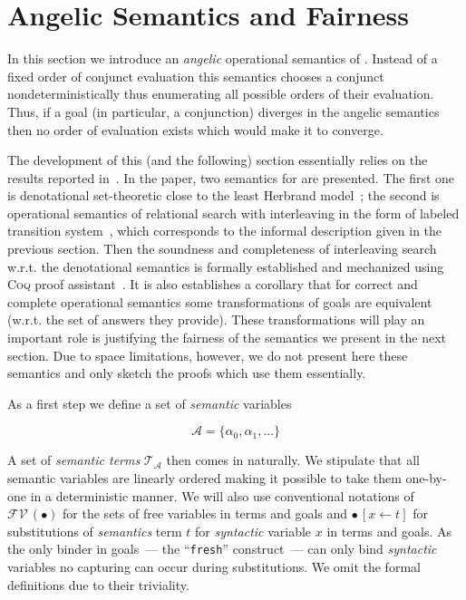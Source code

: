 \section{Angelic Semantics and Fairness}
\label{sec:angelic-semantics}

In this section we introduce an \emph{angelic} operational semantics of \mk. Instead of a fixed order of conjunct evaluation this semantics chooses a conjunct nondeterministically
thus enumerating all possible orders of their evaluation. Thus, if a goal (in particular, a conjunction) diverges in the angelic semantics then no order of evaluation exists which
would make it to converge.

The development of this (and the following) section essentially relies on the results reported in~\cite{fair:semantics}. In the paper, two semantics for \mk are presented. The first one is
denotational set-theoretic close to the least Herbrand model~\cite{Lloyd}; the second is operational semantics of relational search with interleaving in the form of labeled transition
system~\cite{LTS}, which corresponds to the informal description given in the previous section. Then the soundness and completeness of interleaving search w.r.t. the denotational semantics
is formally established and mechanized using \textsc{Coq} proof assistant~\cite{Coq}. It is also establishes a corollary that for correct and complete operational semantics some
transformations of goals are equivalent (w.r.t. the set of answers they provide). These transformations will play an important role is justifying the fairness of the semantics we present
in the next section. Due to space limitations, however, we do not present here these semantics and only sketch the proofs which use them essentially.
 
As a first step we define a set of \emph{semantic} variables

\[
\mathcal{A}=\{\alpha_0,\alpha_1,\dots\}
\]

A set of \emph{semantic terms} $\mathcal{T}_{\mathcal A}$ then comes in naturally. We stipulate that all semantic variables are linearly ordered making it possible to take them one-by-one
in a deterministic manner. We will also use conventional notations of $\mathcal{FV}\,(\bullet)$ for the sets of free variables in terms and goals and $\bullet\,[x\gets t]$ for substitutions
of \emph{semantics} term $t$ for \emph{syntactic} variable $x$ in terms and goals. As the only binder in goals~--- the ``\lstinline|fresh|'' construct~--- can only bind \emph{syntactic}
variables no capturing can occur during substitutions. We omit the formal definitions due to their triviality.

